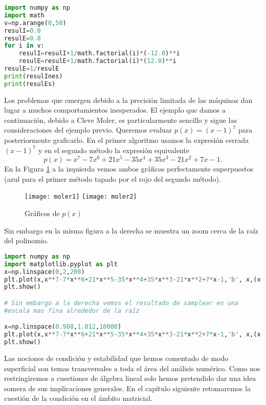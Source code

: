 \begin{Shaded}
\begin{lstlisting}[language=python]
import numpy as np
import math
v=np.arange(0,50)
resulI=0.0
resulE=0.0
for i in v:
	resulI=resulI+1/math.factorial(i)*(-12.0)**i
	resulE=resulE+1/math.factorial(i)*(12.0)**i
resulE=1/resulE
print(resulInes)
print(resulEs)
\end{lstlisting}
\end{Shaded}
Los problemas que emergen debido a la precisión limitada de las máquinas dan lugar a muchos comportamientos inesperados. El ejemplo que damos a continuación, debido a Cleve Moler, es particularmente sencillo y sigue las consideraciones del ejemplo previo. Queremos evaluar $p(x)=(x-1)^7$ para posteriormente graficarlo.
En el primer algoritmo usamos la expresión cerrada $(x-1)^7$  y en el segundo método la expresión equivalente
$$
p(x)=x^7-7x^6+21x^5-35x^4+35x^3-21x^2+7x-1.
$$
En la Figura \ref{fig:moler} a la izquierda vemos ambos gráficos perfectamente superpuestos (azul para el primer método tapado por el rojo del segundo método).
\begin{figure}
 \texttt{[image: moler1]}
 \texttt{[image: moler2]}
 \caption{Gráficos de $p(x)$}
 \label{fig:moler}
 \end{figure}
Sin embargo en la misma figura a la derecha se muestra un zoom cerca de la raíz del polinomio.

\begin{Shaded}
\begin{lstlisting}[language=python]
import numpy as np
import matplotlib.pyplot as plt
x=np.linspace(0,2,200)
plt.plot(x,x**7-7*x**6+21*x**5-35*x**4+35*x**3-21*x**2+7*x-1,'b', x,(x-1)**7,'r')
plt.show()

# Sin embargo a la derecha vemos el resultado de samplear en una
#escala mas fina alrededor de la raíz

x=np.linspace(0.988,1.012,10000)
plt.plot(x,x**7-7*x**6+21*x**5-35*x**4+35*x**3-21*x**2+7*x-1,'b', x,(x-1)**7,'r')
plt.show()
\end{lstlisting}
\end{Shaded}


Las nociones de condición y estabilidad que hemos comentado de modo superficial son temas transversales a toda el área del análisis  numérico. Como nos restringiremos a cuestiones de álgebra lineal solo hemos pretendido dar una idea somera de sus implicaciones generales. En el capítulo siguiente retomaremos la cuestión de la condición en el ámbito matricial.

